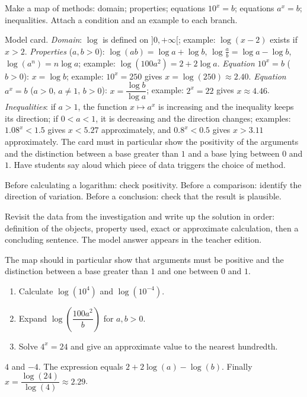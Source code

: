 \begin{activity}
Make a map of methods: domain; properties; equations $10^x=b$; equations $a^x=b$; inequalities. Attach a condition and an example to each branch.

\end{activity}
\begin{solution}Model card. \emph{Domain}: $\log$ is defined on $]0,+\infty[$; example: $\log(x-2)$ exists if $x>2$. \emph{Properties} ($a,b>0$): $\log(ab)=\log a+\log b$, $\log\frac ab=\log a-\log b$, $\log(a^n)=n\log a$; example: $\log(100a^2)=2+2\log a$. \emph{Equation $10^x=b$} ($b>0$): $x=\log b$; example: $10^x=250$ gives $x=\log(250)\approx\num{2,40}$. \emph{Equation $a^x=b$} ($a>0$, $a\neq1$, $b>0$): $x=\dfrac{\log b}{\log a}$; example: $2^x=22$ gives $x\approx\num{4,46}$. \emph{Inequalities}: if $a>1$, the function $x\mapsto a^x$ is increasing and the inequality keeps its direction; if $0<a<1$, it is decreasing and the direction changes; examples: $\num{1,08}^x<\num{1,5}$ gives $x<\num{5,27}$ approximately, and $\num{0,8}^x<\num{0,5}$ gives $x>\num{3,11}$ approximately. The card must in particular show the positivity of the arguments and the distinction between a base greater than $1$ and a base lying between $0$ and $1$. Have students say aloud which piece of data triggers the choice of method.\end{solution}

\begin{summary}Before calculating a logarithm: check positivity. Before a comparison: identify the direction of variation. Before a conclusion: check that the result is plausible.\end{summary}

\begin{example}
Revisit the data from the investigation and write up the solution in order: definition of the objects, property used, exact or approximate calculation, then a concluding sentence. The model answer appears in the teacher edition.
\end{example}
\begin{solution}The map should in particular show that arguments must be positive and the distinction between a base greater than $1$ and one between $0$ and $1$.\end{solution}

\begin{exercise}[essential]
\begin{enumerate}\item Calculate $\log(10^4)$ and $\log(10^{-4})$.\item Expand $\log\!\left(\dfrac{100a^2}{b}\right)$ for $a,b>0$.\item Solve $4^x=24$ and give an approximate value to the nearest hundredth.\end{enumerate}
\end{exercise}
\begin{solution}$4$ and $-4$. The expression equals $2+2\log(a)-\log(b)$. Finally $x=\dfrac{\log(24)}{\log(4)}\approx\num{2,29}$.\end{solution}

